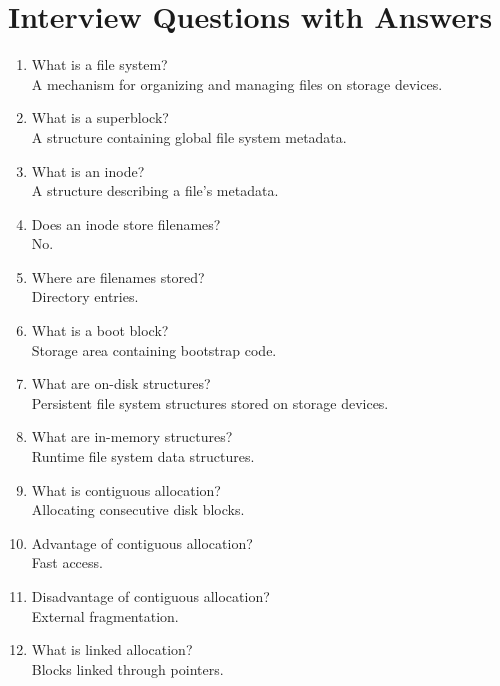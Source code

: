 \section{Interview Questions with Answers}

\begin{enumerate}
\item What is a file system?\\
A mechanism for organizing and managing files on storage devices.

\item What is a superblock?\\
A structure containing global file system metadata.

\item What is an inode?\\
A structure describing a file's metadata.

\item Does an inode store filenames?\\
No.

\item Where are filenames stored?\\
Directory entries.

\item What is a boot block?\\
Storage area containing bootstrap code.

\item What are on-disk structures?\\
Persistent file system structures stored on storage devices.

\item What are in-memory structures?\\
Runtime file system data structures.

\item What is contiguous allocation?\\
Allocating consecutive disk blocks.

\item Advantage of contiguous allocation?\\
Fast access.

\item Disadvantage of contiguous allocation?\\
External fragmentation.

\item What is linked allocation?\\
Blocks linked through pointers.


\end{enumerate}
